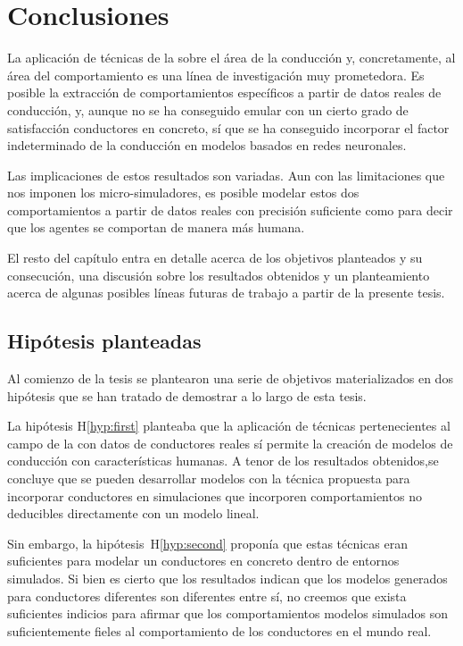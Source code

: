\chapter{Conclusiones}
\label{ch:conclusions}

La aplicación de técnicas de la  sobre el área de la conducción y, concretamente, al área del comportamiento es una línea de investigación muy prometedora. Es posible la extracción de comportamientos específicos a partir de datos reales de conducción, y, aunque no se ha conseguido emular con un cierto grado de satisfacción conductores en concreto, sí que se ha conseguido incorporar el factor indeterminado de la conducción en modelos basados en redes neuronales.

Las implicaciones de estos resultados son variadas. Aun con las limitaciones que nos imponen los micro-simuladores, es posible modelar estos dos comportamientos a partir de datos reales con precisión suficiente como para decir que los agentes se comportan de manera más humana.

El resto del capítulo entra en detalle acerca de los objetivos planteados y su consecución, una discusión sobre los resultados obtenidos y un planteamiento acerca de algunas posibles líneas futuras de trabajo a partir de la presente tesis.

\section{Hipótesis planteadas}

Al comienzo de la tesis se plantearon una serie de objetivos materializados en dos hipótesis que se han tratado de demostrar a lo largo de esta tesis.

La hipótesis H\ref{hyp:first} planteaba que la aplicación de técnicas pertenecientes al campo de la  con datos de conductores reales sí permite la creación de modelos de conducción con características humanas. A tenor de los resultados obtenidos,se concluye que se pueden desarrollar modelos con la técnica propuesta para incorporar conductores en simulaciones que incorporen comportamientos no deducibles directamente con un modelo lineal.

Sin embargo, la hipótesis~H\ref{hyp:second} proponía que estas técnicas eran suficientes para modelar un conductores en concreto dentro de entornos simulados. Si bien es cierto que los resultados indican que los modelos generados para conductores diferentes son diferentes entre sí, no creemos que exista suficientes indicios para afirmar que los comportamientos modelos simulados son suficientemente fieles al comportamiento de los conductores en el mundo real.

